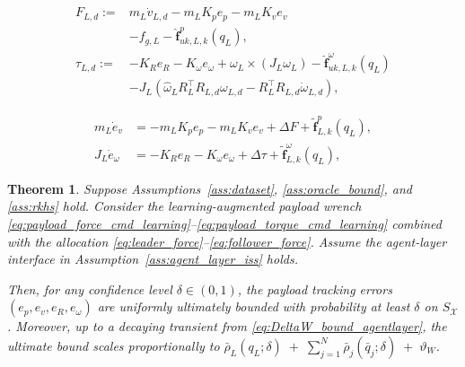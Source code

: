 \documentclass[10pt,a4paper]{amsart}
\newtheorem{theorem}{Theorem}
\begin{document}
\begin{align}
F_{L,d}
:=&
m_L\dot v_{L,d}
- m_LK_p e_p - m_LK_v e_v\nonumber\\
&- f_{g,L}
- \hat{\mathbf f}^{p}_{uk,L,k}(q_L),
\label{eq:payload_force_cmd_learning}\\
\tau_{L,d}
:=&
-K_R e_R - K_\omega e_\omega
+ \omega_L\times(J_L\omega_L)- \hat{\mathbf f}^{\omega}_{uk,L,k}(q_L)\nonumber\\
&
- J_L\!\left(\hat\omega_L R_L^\top R_{L,d}\omega_{L,d}
- R_L^\top R_{L,d}\dot\omega_{L,d}\right),
\label{eq:payload_torque_cmd_learning}
\end{align}

\begin{align}
m_L\dot e_v
&=
- m_LK_p e_p - m_LK_v e_v
+ \Delta F
+ \tilde{\mathbf f}^{p}_{L,k}(q_L),
\label{eq:err_ev_learning}\\
J_L\dot e_\omega
&=
- K_R e_R - K_\omega e_\omega
+ \Delta \tau
+ \tilde{\mathbf f}^{\omega}_{L,k}(q_L),
\label{eq:err_eomega_learning}
\end{align}

\begin{theorem}
\label{thm:learning_tracking}
Suppose Assumptions~\ref{ass:dataset}, \ref{ass:oracle_bound}, and \ref{ass:rkhs} hold.
Consider the learning-augmented payload wrench
\eqref{eq:payload_force_cmd_learning}--\eqref{eq:payload_torque_cmd_learning}
combined with the allocation \eqref{eq:leader_force}--\eqref{eq:follower_force}.
Assume the agent-layer interface in Assumption~\ref{ass:agent_layer_iss} holds.

Then, for any confidence level $\delta\in(0,1)$, the payload tracking errors
$(e_p,e_v,e_R,e_\omega)$ are uniformly ultimately bounded with probability at least $\delta$ on $S_{\mathcal X}$. Moreover, up to a decaying transient from \eqref{eq:DeltaW_bound_agentlayer},
the ultimate bound scales proportionally to
$\displaystyle{
\bar\rho_L(q_L;\delta)
\;+\;
\sum_{j=1}^N \bar\rho_j(\bar q_j;\delta)
\;+\;\vartheta_W}$. \end{theorem}
\end{document}
